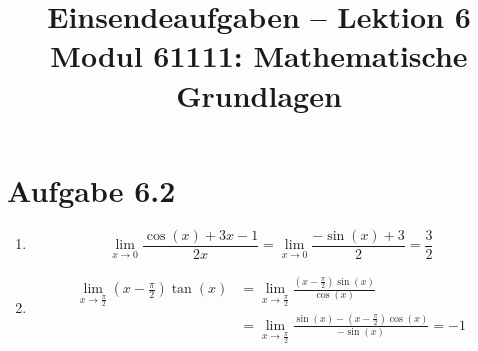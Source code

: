 \documentclass[a4paper,12pt]{article}
\title{Einsendeaufgaben -- Lektion 6\\[0.5em]
\large Modul 61111: Mathematische Grundlagen}
\author{}
\date{}
\begin{document}
\maketitle

\section*{Aufgabe 6.2}

\begin{enumerate}[label=\alph*)]

\item
\[
  \lim_{x \to 0} \frac{\cos(x) + 3x - 1}{2x}
  = \lim_{x \to 0} \frac{-\sin(x) + 3}{2}
  = \frac{3}{2}
\]

\item
\begin{align*}
  \lim_{x \to \frac{\pi}{2}} \left(x - \frac{\pi}{2}\right) \tan(x)
  &= \lim_{x \to \frac{\pi}{2}} \frac{\left(x - \frac{\pi}{2}\right) \sin(x)}{\cos(x)} \\
  &= \lim_{x \to \frac{\pi}{2}} \frac{\sin(x) - \left(x - \frac{\pi}{2}\right) \cos(x)}{-\sin(x)}
  = -1
\end{align*}

\end{enumerate}
\end{document}
